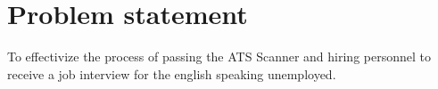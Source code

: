 \section{Problem statement}\label{sec:problem}
To effectivize the process of passing the ATS Scanner and hiring personnel to receive a job interview for the english speaking unemployed.